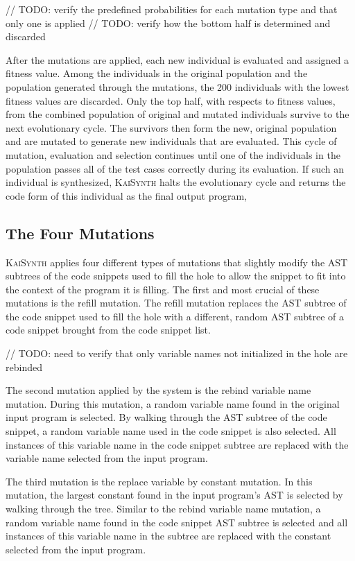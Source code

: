 \documentclass{article}
\begin{document}
// TODO: verify the predefined probabilities for each mutation type and that only one is applied
// TODO: verify how the bottom half is determined and discarded

After the mutations are applied, each new individual is evaluated and assigned a fitness value. Among the individuals in the original population and the population generated through the mutations, the 200 individuals with the lowest fitness values are discarded. Only the top half, with respects to fitness values, from the combined population of original and mutated individuals survive to the next evolutionary cycle. The survivors then form the new, original population and are mutated to generate new individuals that are evaluated. This cycle of mutation, evaluation and selection continues until one of the individuals in the population passes all of the test cases correctly during its evaluation. If such an individual is synthesized, \textsc{KaiSynth} halts the evolutionary cycle and returns the code form of this individual as the final output program,

\subsection{The Four Mutations}

\textsc{KaiSynth} applies four different types of mutations that slightly modify the AST subtrees of the code snippets used to fill the hole to allow the snippet to fit into the context of the program it is filling. The first and most crucial of these mutations is the refill mutation. The refill mutation replaces the AST subtree of the code snippet used to fill the hole with a different, random AST subtree of a code snippet brought from the code snippet list.

// TODO: need to verify that only variable names not initialized in the hole are rebinded

The second mutation applied by the system is the rebind variable name mutation. During this mutation, a random variable name found in the original input program is selected. By walking through the AST subtree of the code snippet, a random variable name used in the code snippet is also selected. All instances of this variable name in the code snippet subtree are replaced with the variable name selected from the input program. 

The third mutation is the replace variable by constant mutation. In this mutation, the largest constant found in the input program's AST is selected by walking through the tree. Similar to the rebind variable name mutation, a random variable name found in the code snippet AST subtree is selected and all instances of this variable name in the subtree are replaced with the constant selected from the input program.
\end{document}
